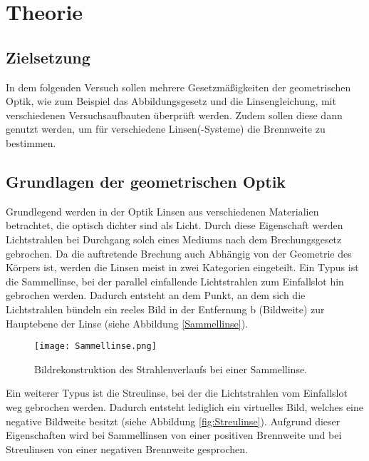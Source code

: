 



\section{Theorie}

\subsection{Zielsetzung}

In dem folgenden Versuch sollen mehrere Gesetzmäßigkeiten der geometrischen Optik,
wie zum Beispiel das Abbildungsgesetz und die Linsengleichung, mit verschiedenen
Versuchsaufbauten überprüft werden. Zudem sollen diese dann genutzt werden, um
für verschiedene Linsen(-Systeme) die Brennweite zu bestimmen.

\subsection{Grundlagen der geometrischen Optik}

Grundlegend werden in der Optik Linsen aus verschiedenen Materialien betrachtet,
die optisch dichter sind als Licht. Durch diese Eigenschaft werden Lichtstrahlen
bei Durchgang solch eines Mediums nach dem Brechungsgesetz gebrochen. Da die
auftretende Brechung auch Abhängig von der Geometrie des Körpers ist, werden
die Linsen meist in zwei Kategorien eingeteilt. Ein Typus ist die Sammellinse, bei
der parallel einfallende Lichtstrahlen zum Einfallslot hin gebrochen werden.
Dadurch entsteht an dem Punkt, an dem sich die Lichtstrahlen bündeln ein reeles
Bild in der Entfernung b (Bildweite) zur Hauptebene der Linse (siehe Abbildung
\ref{Sammellinse}).

\begin{figure}
  \centering
  \texttt{[image: Sammellinse.png]}
  \caption{Bildrekonstruktion des Strahlenverlaufs bei einer Sammellinse.\cite{anleitung01}}
  \label{fig:Sammellinse}
\end{figure}

Ein weiterer Typus ist die Streulinse, bei der die Lichtstrahlen vom Einfallslot
weg gebrochen werden. Dadurch entsteht lediglich ein virtuelles Bild, welches
eine negative Bildweite besitzt (siehe Abbildung \ref{fig:Streulinse}). Aufgrund dieser
Eigenschaften wird bei Sammellinsen von einer positiven Brennweite und bei
Streulinsen von einer negativen Brennweite gesprochen.


